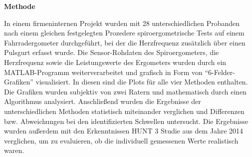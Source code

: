 \begin{center} \textbf{\Large Methode} \end{center}

In einem firmeninternen Projekt wurden mit 28 unterschiedlichen Probanden nach einem gleichen festgelegten Prozedere spiroergometrische Tests auf einem Fahrradergometer durchgeführt, bei der die Herzfrequenz zusätzlich über einen Pulsgurt erfasst wurde. Die Sensor-Rohdaten des Spiroergometers, die Herzfrequenz sowie die Leistungswerte des Ergometers wurden durch ein MATLAB-Programm weiterverarbeitet und grafisch in Form von "`6-Felder-Grafiken"' visualisiert. In diesen sind die Plots für alle vier Methoden enthalten. Die Grafiken wurden subjektiv von zwei Ratern und mathematisch durch einen Algorithmus analysiert. Anschließend wurden die Ergebnisse der unterschiedlichen Methoden statistisch miteinander verglichen und Differenzen bzw. Abweichungen bei den identifizierten Schwellen untersucht. Die Ergebnisse wurden außerdem mit den Erkenntnissen HUNT 3 Studie aus dem Jahre 2014 verglichen, um zu evaluieren, ob die individuell gemessenen Werte realistisch waren.
